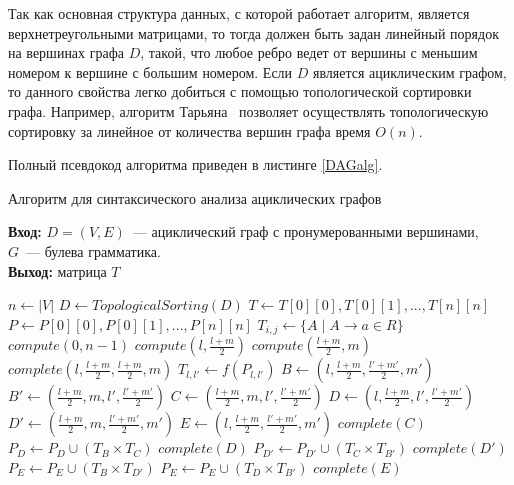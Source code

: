 Так как основная структура данных, с которой работает алгоритм,
является верхнетреугольными матрицами, то тогда должен быть
задан линейный порядок на вершинах графа $D$, такой, что любое
ребро ведет от вершины с меньшим номером к вершине с
большим номером. Если $D$ является ациклическим графом, то
данного свойства легко добиться с помощью топологической
сортировки графа. Например, алгоритм Тарьяна~\cite{Tarjan} позволяет
осуществлять топологическую сортировку за линейное от
количества вершин графа время $O(n)$.

Полный псевдокод алгоритма приведен в листинге \ref{DAGalg}.
\begin{algorithm}
\caption{Алгоритм для синтаксического анализа ациклических графов}\label{DAGalg}
 \hspace*{\algorithmicindent} \textbf{Вход:} $D = (V, E)$~--- ациклический граф с пронумерованными вершинами, \\$G$~--- булева грамматика.\\
 \hspace*{\algorithmicindent} \textbf{Выход:} матрица $T$
\begin{algorithmic}[1]
\State $n \gets |V|$
\State $D \gets TopologicalSorting(D)$
\State $T \gets T[0][0], T[0][1], ... , T[n] [n]$
\State $P \gets P[0][0], P[0][1], ... , P[n] [n]$
\State $T_{i,j} \gets \{A \mid A \to a \in R\}$
\EndFor
\State $compute(0, n-1)$
\State $compute(l, \frac{l+m}{2})$
\State $compute(\frac{l+m}{2},m)$
\EndIf
\State $complete(l, \frac{l+m}{2}, \frac{l+m}{2}, m)$
\EndProcedure
{}
\State $T_{l,l'} \gets f(P_{l,l'})$
\State $B \gets (l, \frac{l+m}{2}, \frac{l'+m'}{2}, m')$
\State $B' \gets (\frac{l+m}{2}, m, l', \frac{l'+m'}{2})$
\State $C \gets (\frac{l+m}{2}, m, l', \frac{l'+m'}{2})$
\State $D \gets (l, \frac{l+m}{2}, l', \frac{l'+m'}{2})$
\State $D' \gets (\frac{l+m}{2}, m, \frac{l'+m'}{2}, m')$
\State $E \gets (l, \frac{l+m}{2}, \frac{l'+m'}{2}, m')$
\State $complete(C)$
\State $P_D \gets P_D \cup (T_B \times T_C)$
\State $complete(D)$
\State $P_{D'} \gets P_{D'} \cup (T_C \times T_{B'})$
\State $complete(D')$
\State $P_{E} \gets P_{E} \cup (T_B \times T_{D'})$
\State $P_{E} \gets P_{E} \cup (T_D \times T_{B'})$
\State $complete(E)$
\EndIf

\EndProcedure

\end{algorithmic}
\end{algorithm}

